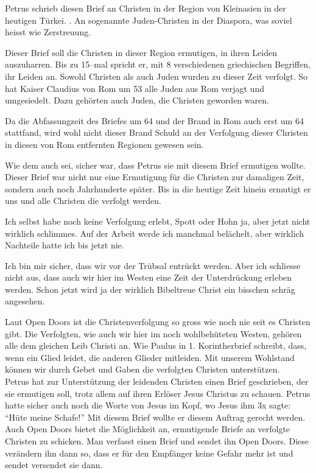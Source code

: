 \documentclass[fontsize=16pt]{mybib}
\begin{document}
Petrus schrieb diesen Brief an Christen in der Region von Kleinasien in der heutigen Türkei. . An sogenannte Juden-Christen in der Diaspora, was soviel heisst wie Zerstreuung.

Dieser Brief soll die Christen in dieser Region ermutigen, in ihren Leiden auszuharren. Bis zu 15--mal spricht er, mit 8 verschiedenen griechischen Begriffen, ihr Leiden an. Sowohl Christen als auch Juden wurden zu dieser Zeit verfolgt. So hat Kaiser Claudius von Rom um 53 \nChr{} alle Juden aus Rom verjagt und umgesiedelt. Dazu gehörten auch Juden, die Christen geworden waren.

Da die Abfassungzeit des Briefes um 64 \nChr{} und der Brand in Rom auch erst um 64 \nChr{} stattfand, wird wohl nicht dieser Brand Schuld an der Verfolgung dieser Christen in diesen von Rom entfernten Regionen gewesen sein.

Wie dem auch sei, sicher war, dass Petrus sie mit diesem Brief ermutigen wollte. Dieser Brief war nicht nur eine Ermutigung für die Christen zur damaligen Zeit, sondern auch noch Jahrhunderte später. Bis in die heutige Zeit hinein ermutigt er uns und alle Christen die verfolgt werden.

Ich selbst habe noch keine Verfolgung erlebt, Spott oder Hohn ja, aber jetzt nicht wirklich schlimmes. Auf der Arbeit werde ich manchmal belächelt, aber wirklich Nachteile hatte ich bis jetzt nie.

Ich bin mir sicher, dass wir vor der Trübsal entrückt werden. Aber ich schliesse nicht aus, dass auch wir hier im Westen eine Zeit der Unterdrückung erleben werden. Schon jetzt wird ja der wirklich Bibeltreue Christ ein bisschen schräg angesehen.

Laut Open Doors ist die Christenverfolgung so gross wie noch nie seit es Christen gibt. Die Verfolgten, wie auch wir hier im noch wohlbehüteten Westen, gehören alle dem gleichen Leib Christi an. Wie Paulus in 1. Korintherbrief schreibt, dass, wenn ein Glied leidet, die anderen Glieder mitleiden. Mit unserem Wohlstand können wir durch Gebet und Gaben die verfolgten Christen unterstützen.\\
Petrus hat zur Unterstützung der leidenden Christen einen Brief geschrieben, der sie ermutigen soll, trotz allem auf ihren Erlöser Jesus Christus zu schauen. Petrus hatte sicher auch noch die Worte von Jesus im Kopf, wo Jesus ihm 3x sagte: \enquote{Hüte meine Schafe!} Mit diesem Brief wollte er diesem Auftrag gerecht werden.\\
Auch Open Doors bietet die Möglichkeit an, ermutigende Briefe an verfolgte Christen zu schicken. Man verfasst einen Brief und sendet ihn Open Doors. Diese verändern ihn dann so, dass er für den Empfänger keine Gefahr mehr ist und sendet versendet sie dann.
\end{document}
